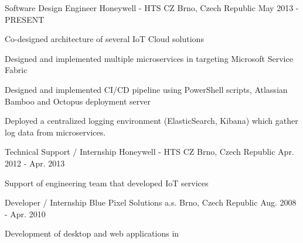 

\begin{cventries}

  \cventry
    {Software Design Engineer} %
    {Honeywell - HTS CZ} %
    {Brno, Czech Republic} %
    {May 2013 - PRESENT} %
    {
      \begin{cvitems} %
        \item {Co-designed architecture of several IoT Cloud solutions}
        \item {Designed and implemented multiple microservices in \Csharp{} targeting Microsoft Service Fabric}
        \item {Designed and implemented CI/CD pipeline using PowerShell scripts, Atlassian Bamboo and Octopus deployment server}
        \item {Deployed a centralized logging environment (ElasticSearch, Kibana) which gather log data from microservices.}
      \end{cvitems}
    }

  \cventry
    {Technical Support / Internship} %
    {Honeywell - HTS CZ} %
    {Brno, Czech Republic} %
    {Apr. 2012 - Apr. 2013} %
    {
      \begin{cvitems} %
        \item {Support of engineering team that developed IoT services}
      \end{cvitems}
    }

  \cventry
    {\Csharp{} Developer / Internship} %
    {Blue Pixel Solutions a.s.} %
    {Brno, Czech Republic} %
    {Aug. 2008 - Apr. 2010} %
    {
      \begin{cvitems} %
        \item {Development of desktop and web applications in \Csharp{}}
      \end{cvitems}
    }

\end{cventries}
